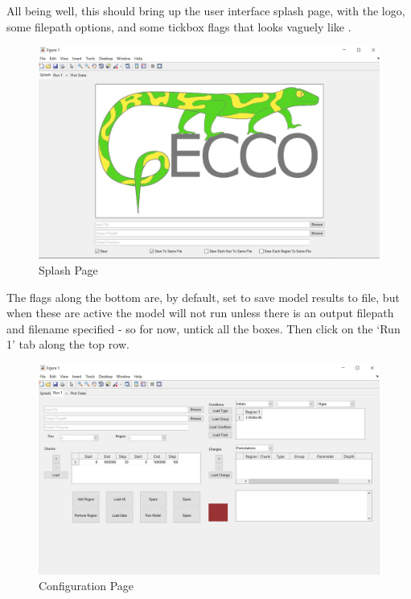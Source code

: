 \documentclass[12pt,twoside,onecolumn,a4paper]{article}
\begin{document}
All being well, this should bring up the user interface splash page, with the logo, some filepath options, and some tickbox flags that looks vaguely like .

\begin{figure}[H]
\centering
\includegraphics[width=15cm]{./Figures/Splash_Page.jpg}
\caption{Splash Page}
\end{figure}

The flags along the bottom are, by default, set to save model results to file, but when these are active the model will not run unless there is an output filepath and filename specified - so for now, untick all the boxes. Then click on the `Run 1' tab along the top row.

\begin{figure}[H]
\centering
\includegraphics[width=15cm]{./Figures/Configuration_Page.jpg}
\caption{Configuration Page}
\end{figure}
\end{document}
